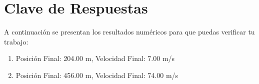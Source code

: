 \documentclass[11pt,a4paper]{article}
\begin{document}
\newpage

\section*{Clave de Respuestas}
A continuación se presentan los resultados numéricos para que puedas verificar tu trabajo:

\begin{enumerate}[label=\textbf{Ejercio \arabic*:}]
\item Posición Final: 204.00 m, Velocidad Final: 7.00 m/s

\item Posición Final: 456.00 m, Velocidad Final: 74.00 m/s

\end{enumerate}
\end{document}
